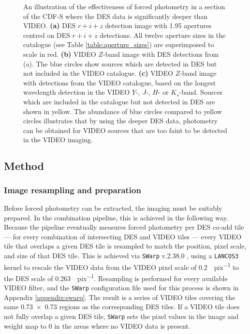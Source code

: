 \begin{figure}[!htpb]
\caption[Forced photometry]{An illustration of the effectiveness of forced photometry in a section of the CDF-S where the DES data is significantly deeper than VIDEO. \textbf{(a)} DES $r+i+z$ detection image with \SI{1.95}{\arcsec} apertures centred on DES $r+i+z$ detections. All twelve aperture sizes in the \DESVIDEO catalogue (see Table \ref{table:aperture_sizes}) are superimposed to scale in red. \textbf{(b)} VIDEO $Z$-band image with DES detections from (a). The blue circles show sources which are detected in DES but not included in the VIDEO \cite{2013MNRAS.428.1281J} catalogue. \textbf{(c)} VIDEO $Z$-band image with detections from the \cite{2013MNRAS.428.1281J} VIDEO catalogue, based on the longest wavelength detection in the VIDEO $Y$-, $J$-, $H$- or $K_{s}$-band. Sources which are included in the \cite{2013MNRAS.428.1281J} catalogue but not detected in DES are shown in yellow. The abundance of blue circles compared to yellow circles illustrates that by using the deeper DES data, photometry can be obtained for VIDEO sources that are too faint to be detected in the VIDEO imaging.}
\label{fig:forced_photometry_des_cat}
\end{figure}


\subsection{Method}\label{subsection:forced_phot_preparation}
\subsubsection{Image resampling and preparation}\label{subsubsection:image_resampling}
Before forced photometry can be extracted, the imaging must be suitably prepared. In the \DESVIDEO combination pipeline, this is achieved in the following way. Because the pipeline eventually measures forced photometry per DES co-add tile --- for every combination of intersecting DES and VIDEO tiles --- every VIDEO tile that overlaps a given DES tile is resampled to match the position, pixel scale, and size of that DES tile. This is achieved via \texttt{SWarp} v.2.38.0 \citep{2002ASPC..281..228B,2010ascl.soft10068B}, using a \texttt{LANCOS3} kernel to rescale the VIDEO data from the VIDEO pixel scale of \SI{0.2}{\arcsec.pix^{-1}} to the DES scale of \SI{0.263}{\arcsec.pix^{-1}}. Resampling is performed for every available VIDEO filter, and the \texttt{SWarp} configuration file used for this process is shown in Appendix \ref{appendix:swarp}. The result is a series of VIDEO tiles covering the same \SI{0.73 x 0.73}{\sqdeg} regions as the corresponding DES tiles. If a VIDEO tile does not fully overlap a given DES tile, \texttt{SWarp} sets the pixel values in the image and weight map to 0 in the areas where no VIDEO data is present. \par 


